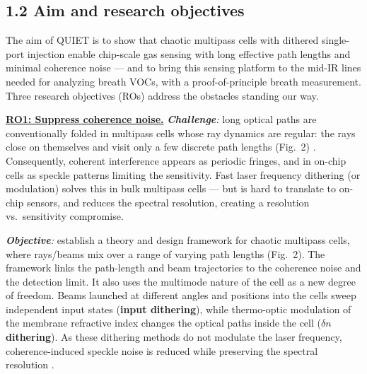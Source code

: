 \documentclass[a4paper,12pt]{article}
\newcommand{\hc}[1]{\textcolor{dkplum}{#1}} %
\begin{document}
\subsection*{1.2 Aim and research objectives}

The aim of QUIET is to show that chaotic multipass cells with dithered single-port injection enable chip-scale gas sensing with long effective path lengths and minimal coherence noise --- and to bring this sensing platform to the mid-IR lines needed for analyzing breath VOCs, with a proof-of-principle breath measurement. 
Three research objectives (ROs) address the obstacles standing our way.

\underline{\textbf{RO1: Suppress coherence noise.}} \emph{\textbf{Challenge}:} long optical paths are conventionally folded in multipass cells whose ray dynamics are regular: the rays close on themselves and visit only a few discrete path lengths (Fig.~2) \cite{White1942,Herriott1964}. Consequently, coherent interference appears as periodic fringes, and in on-chip cells as speckle patterns limiting the sensitivity. Fast laser frequency dithering (or modulation) solves this in bulk multipass cells --- but is hard to translate to on-chip sensors, and reduces the spectral resolution, creating a resolution vs.~sensitivity compromise.

\emph{\textbf{Objective}:} establish a theory and design framework for chaotic multipass cells, where rays/beams mix over a range of varying path lengths (Fig.~2). The framework links the path-length and beam trajectories to the coherence noise and the detection limit. It also uses the multimode nature of the cell as a new degree of freedom. Beams launched at different angles and positions into the cells sweep independent input states (\textbf{input dithering}), while thermo-optic modulation of the membrane refractive index changes the optical paths inside the cell (\textbf{$\delta n$ dithering}). As these dithering methods do not modulate the laser frequency, coherence-induced speckle noise is reduced while preserving the spectral resolution \cite{Redding2012,Cao2019}.
\end{document}
